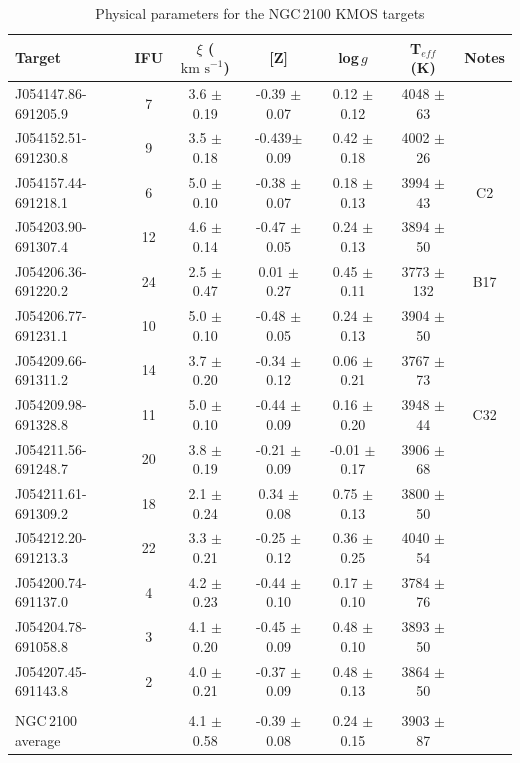 \documentclass[useAMS,usenatbib]{mn2e}
\def\kms{$\mbox{km s}^{-1}$}
\begin{document}
\begin{table}
\begin{center}
\caption{
Physical parameters for the NGC\,2100 KMOS targets
\label{tb:stellar-params}
         }
\scriptsize
\begin{tabular}{lc ccccc}
 \hline
 \hline
  Target  & IFU & $\xi$ (\kms) & [Z] & log\,$g$ & T$_{eff}$ (K) & Notes\\
  \hline
J054147.86-691205.9 & 7  & 3.6 $\pm$ 0.19 & -0.39 $\pm$ 0.07 &  0.12 $\pm$ 0.12 & 4048 $\pm$ 63 & \\
J054152.51-691230.8 & 9  & 3.5 $\pm$ 0.18 & -0.439$\pm$ 0.09 &  0.42 $\pm$ 0.18 & 4002 $\pm$ 26 & \\
J054157.44-691218.1 & 6  & 5.0 $\pm$ 0.10 & -0.38 $\pm$ 0.07 &  0.18 $\pm$ 0.13 & 3994 $\pm$ 43 & C2\\
J054203.90-691307.4 & 12 & 4.6 $\pm$ 0.14 & -0.47 $\pm$ 0.05 &  0.24 $\pm$ 0.13 & 3894 $\pm$ 50 & \\
J054206.36-691220.2 & 24 & 2.5 $\pm$ 0.47 &  0.01 $\pm$ 0.27 &  0.45 $\pm$ 0.11 & 3773 $\pm$ 132 & B17\\
J054206.77-691231.1 & 10 & 5.0 $\pm$ 0.10 & -0.48 $\pm$ 0.05 &  0.24 $\pm$ 0.13 & 3904 $\pm$ 50 & \\
J054209.66-691311.2 & 14 & 3.7 $\pm$ 0.20 & -0.34 $\pm$ 0.12 &  0.06 $\pm$ 0.21 & 3767 $\pm$ 73 & \\
J054209.98-691328.8 & 11 & 5.0 $\pm$ 0.10 & -0.44 $\pm$ 0.09 &  0.16 $\pm$ 0.20 & 3948 $\pm$ 44 & C32\\
J054211.56-691248.7 & 20 & 3.8 $\pm$ 0.19 & -0.21 $\pm$ 0.09 & -0.01 $\pm$ 0.17 & 3906 $\pm$ 68 & \\
J054211.61-691309.2 & 18 & 2.1 $\pm$ 0.24 &  0.34 $\pm$ 0.08 &  0.75 $\pm$ 0.13 & 3800 $\pm$ 50 & \\
J054212.20-691213.3 & 22 & 3.3 $\pm$ 0.21 & -0.25 $\pm$ 0.12 &  0.36 $\pm$ 0.25 & 4040 $\pm$ 54 & \\
J054200.74-691137.0 & 4  & 4.2 $\pm$ 0.23 & -0.44 $\pm$ 0.10 &  0.17 $\pm$ 0.10 & 3784 $\pm$ 76 & \\
J054204.78-691058.8 & 3  & 4.1 $\pm$ 0.20 & -0.45 $\pm$ 0.09 &  0.48 $\pm$ 0.10 & 3893 $\pm$ 50 & \\
J054207.45-691143.8 & 2  & 4.0 $\pm$ 0.21 & -0.37 $\pm$ 0.09 &  0.48 $\pm$ 0.13 & 3864 $\pm$ 50 & \\
\\
NGC\,2100 average      & & 4.1 $\pm$ 0.58 & -0.39 $\pm$ 0.08 &  0.24 $\pm$ 0.15 & 3903 $\pm$ 87 &\\



  \hline
  \end{tabular}
  \end{center}
\end{table}
\end{document}
